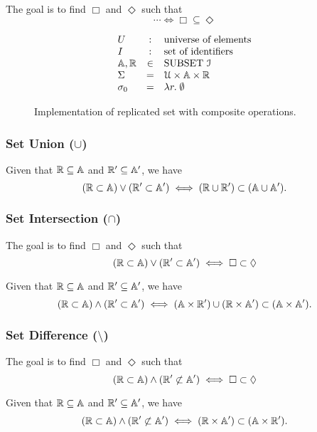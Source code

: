 The goal is to find $\Box$ and $\Diamond$ such that
\[
   \cdots \iff \Box \subseteq \Diamond
\]

\begin{figure}[t]
  \[
    \begin{array}{lcl}
      U &:& \text{universe of elements}	\\
      I &:& \text{set of identifiers}	\\
      \mathbb{A}, \mathbb{R}  &\in& \text{SUBSET } \mathcal{I}	\\
      \Sigma &=& \mathcal{U} \times \mathbb{A} \times \mathbb{R} \\
      \sigma_{0} &=& \lambda r.\; \emptyset
    \end{array}
  \]
  \caption{Implementation of replicated set with composite operations.}
  \label{fig:rset-composite-protocol}
\end{figure}
\subsubsection{Set Union ($\cup$)}

\begin{theorem}
  Given that $\mathbb{R} \subseteq \mathbb{A}$ and $\mathbb{R}' \subseteq \mathbb{A}'$, we have
  \[
    (\mathbb{R} \subset \mathbb{A}) \lor (\mathbb{R}' \subset \mathbb{A}') \iff (\mathbb{R} \cup \mathbb{R}') \subset (\mathbb{A} \cup \mathbb{A}').
  \]
\end{theorem}
\subsubsection{Set Intersection ($\cap$)}


The goal is to find $\Box$ and $\Diamond$ such that
\[
  (\mathbb{R} \subset \mathbb{A}) \lor (\mathbb{R}' \subset \mathbb{A}') \iff \Box \subset \Diamond
\]

\begin{theorem}
  Given that $\mathbb{R} \subseteq \mathbb{A}$ and $\mathbb{R}' \subseteq \mathbb{A}'$, we have 
  \[
    (\mathbb{R} \subset \mathbb{A}) \land (\mathbb{R}' \subset \mathbb{A}') \iff (\mathbb{A} \times \mathbb{R}') \cup (\mathbb{R} \times \mathbb{A}') \subset (\mathbb{A} \times \mathbb{A}').
  \]
\end{theorem}
\subsubsection{Set Difference ($\setminus$)}

The goal is to find $\Box$ and $\Diamond$ such that
\[
  (\mathbb{R} \subset \mathbb{A}) \land (\mathbb{R}' \not\subset \mathbb{A}') \iff \Box \subset \Diamond
\]

\begin{theorem}
  Given that $\mathbb{R} \subseteq \mathbb{A}$ and $\mathbb{R}' \subseteq \mathbb{A}'$, we have 
  \[
    (\mathbb{R} \subset \mathbb{A}) \land (\mathbb{R}' \not\subset \mathbb{A}') \iff (\mathbb{R} \times \mathbb{A}') \subset (\mathbb{A} \times \mathbb{R}').
  \]
\end{theorem}
